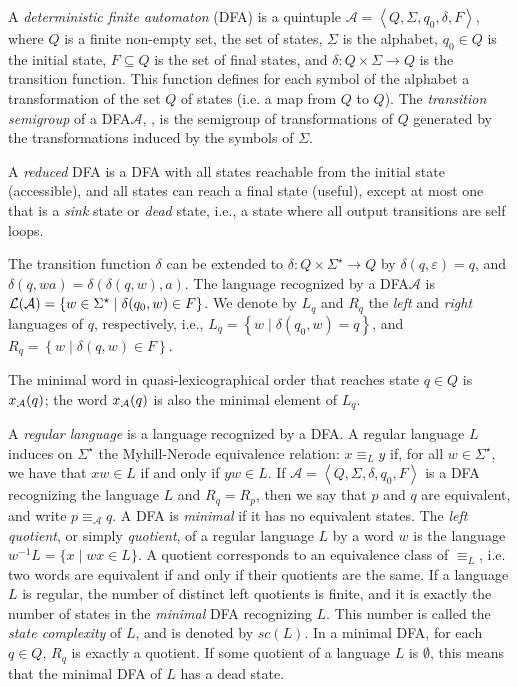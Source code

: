 \documentclass{article}
\newcommand{\dfa}{DFA\xspace}
\newcommand{\mneq}[1]{\equiv_{#1}}
\newcommand{\Set}[1]{\left\{ #1 \right\}}
\newcommand{\tuple}[1]{\left\langle #1\right\rangle}
\newcommand{\lang}[1]{{\cal L}(#1)}
\begin{document}
A \emph{deterministic finite automaton} (\dfa) is a quintuple
$\mathcal{A}=\tuple{Q,\Sigma, q_0,\delta,F}$, where $Q$ is  a finite
non-empty set, the set of states, $\Sigma$ is the  alphabet, $q_0\in
Q$ is the initial state, $F\subseteq Q$ is the set of final states,
and $\delta:Q\times \Sigma\longrightarrow Q$ is the transition
function. This function defines for each symbol of
the alphabet a transformation of the set $Q$ of states (i.e. a map from $Q$ to $Q$). The
\emph{transition semigroup} of a \dfa $\mathcal{A}$, 
\cite{bell14:_symmet_group_and_quotien_compl},
 is the semigroup of transformations of $Q$ generated 
by the transformations induced by the symbols of $\Sigma$.

A \emph{reduced} \dfa is a \dfa with all states reachable from the  
initial state (accessible), and all states can reach a final state 
(useful), except at most one that is a \emph{sink} state or
\emph{dead} state, i.e., a state where all output transitions are self
loops. 


The transition function $\delta$ can be extended to $\delta:Q\times
\Sigma^\star\longrightarrow Q$ by $\delta(q,\varepsilon)=q$, and
$\delta(q,wa)=\delta(\delta(q,w),a)$. 
The language recognized by a \dfa $\mathcal{A}$ is
$\lang{\mathcal{A}}=\{w\in \Sigma^\star\mid \delta(q_0,w)\in F\}$.  
We denote by 
$L_q$ and $R_q$ the \emph{left} and \emph{right} languages of $q$, respectively,
i.e.,  
$L_q = \Set{w \mid  \delta(q_0,w) = q}$, and 
$R_q = \Set{w \mid  \delta(q,w)\in F}$. 

The minimal word in quasi-lexicographical order that reaches state $q\in Q$
is $x_{\cal A}(q)$; the word $x_{\cal A}(q)$ is also the minimal element of $L_q$.

A \emph{regular language} is a language recognized by a \dfa.  
A regular language $L$ 
induces on $\Sigma^\star$ the Myhill-Nerode equivalence relation:
 $x\mneq{L} y$ if, for all $w\in
\Sigma^\star$, we have that $xw\in L$ if and only if $yw\in L$. 
If $\mathcal{A}=\tuple{Q,\Sigma,\delta,q_0,F}$ is a \dfa recognizing
the language $L$ and  $R_q=R_p$, then we say that $p$ and $q$ are equivalent, 
and write $p\mneq{\mathcal{A}} q$.   
A \dfa is \emph{minimal} if it has no equivalent states.
The \emph{left quotient}, or simply \emph{quotient}, of a regular
language $L$ by a word $w$ is the language $w^{-1}L=\{x\mid wx \in
L\}$. A quotient 
corresponds to an equivalence class of $\mneq{L}$, i.e. two words are equivalent if and only if their quotients are the same. 
If a language $L$ is regular, the number of distinct left quotients is
finite, and it is exactly the number of states in the \emph{minimal} \dfa
recognizing $L$. This number is called the \emph{state complexity} of $L$,
 and is denoted by $sc(L)$. 
In a minimal \dfa, for each $q\in Q$, $R_q$ is exactly a quotient. 
If some quotient of a language $L$ is $\emptyset$, this means that the
minimal \dfa of $L$ has a dead state. 
\end{document}
